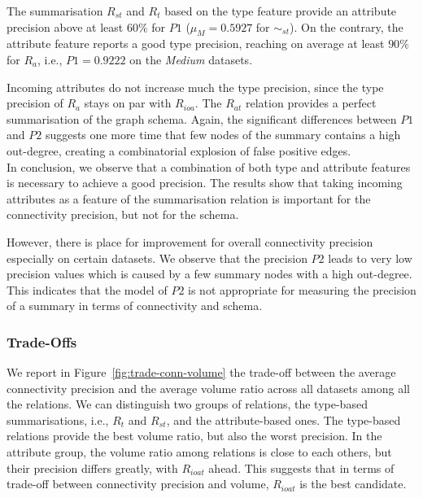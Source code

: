 The summarisation $R_{st}$ and $R_t$ based on the type feature provide an attribute precision above at least $60\%$ for $P1$ ($\mu_M=0.5927$ for $\sim_{st}$).
On the contrary, the attribute feature reports a good type precision, reaching on average at least $90\%$ for $R_a$, i.e., $P1=0.9222$ on the \emph{Medium} datasets.

Incoming attributes do not increase much the type precision, since the type precision of $R_a$ stays on par with $R_{ioa}$. The $R_{at}$ relation provides a perfect summarisation of the graph schema. Again, the significant differences between $P1$ and $P2$ suggests one more time that few nodes of the summary contains a high out-degree, creating a combinatorial explosion of false positive edges.\\



In conclusion, we observe that a combination of both type and attribute features is necessary to achieve a good precision. The results show that taking incoming attributes as a feature of the summarisation relation is important for the connectivity precision, but not for the schema.

However, there is place for improvement for overall connectivity precision especially on certain datasets. We observe that the precision $P2$ leads to very low precision values which is caused by a few summary nodes with a high out-degree. This indicates that the model of $P2$ is not appropriate for measuring the precision of a summary in terms of connectivity and schema.

\subsubsection{Trade-Offs}

We report in Figure~\ref{fig:trade-conn-volume} the trade-off between the average connectivity precision and the average volume ratio across all datasets among all the relations. We can distinguish two groups of relations, the type-based summarisations, i.e., $R_t$ and $R_{st}$, and the attribute-based ones.
The type-based relations provide the best volume ratio, but also the worst precision. In the attribute group, the volume ratio among relations is close to each others, but their precision differs greatly, with $R_{ioat}$ ahead. This suggests that in terms of trade-off between connectivity precision and volume, $R_{ioat}$ is the best candidate.

